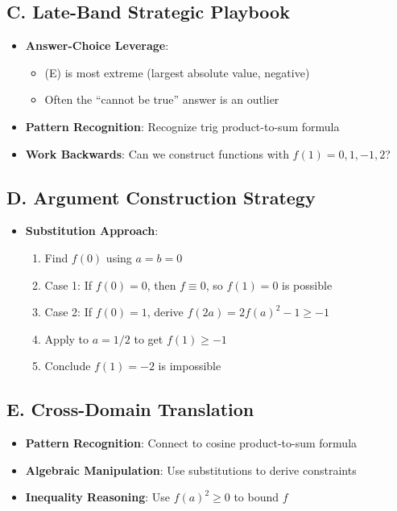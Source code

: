 \documentclass[12pt]{article}
\begin{document}
\begin{strategicbox}
\subsection*{C. Late-Band Strategic Playbook}
\begin{itemize}[leftmargin=*]
    \item \textbf{Answer-Choice Leverage}: 
    \begin{itemize}
        \item (E) is most extreme (largest absolute value, negative)
        \item Often the ``cannot be true'' answer is an outlier
    \end{itemize}
    \item \textbf{Pattern Recognition}: Recognize trig product-to-sum formula
    \item \textbf{Work Backwards}: Can we construct functions with $f(1) = 0, 1, -1, 2$?
\end{itemize}

\subsection*{D. Argument Construction Strategy}
\begin{itemize}[leftmargin=*]
    \item \textbf{Substitution Approach}: 
    \begin{enumerate}
        \item Find $f(0)$ using $a = b = 0$
        \item Case 1: If $f(0) = 0$, then $f \equiv 0$, so $f(1) = 0$ is possible
        \item Case 2: If $f(0) = 1$, derive $f(2a) = 2f(a)^2 - 1 \geq -1$
        \item Apply to $a = 1/2$ to get $f(1) \geq -1$
        \item Conclude $f(1) = -2$ is impossible
    \end{enumerate}
\end{itemize}

\subsection*{E. Cross-Domain Translation}
\begin{itemize}[leftmargin=*]
    \item \textbf{Pattern Recognition}: Connect to cosine product-to-sum formula
    \item \textbf{Algebraic Manipulation}: Use substitutions to derive constraints
    \item \textbf{Inequality Reasoning}: Use $f(a)^2 \geq 0$ to bound $f$
\end{itemize}
\end{strategicbox}
\end{document}
